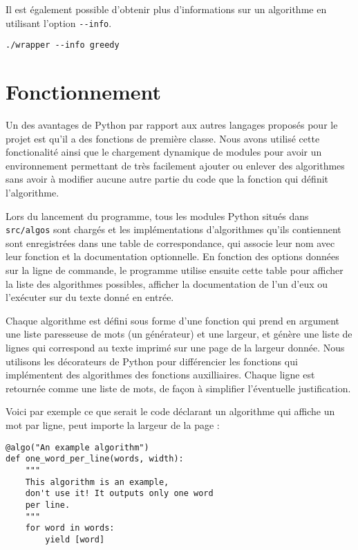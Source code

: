 \documentclass[a4paper, 11pt]{article}
\begin{document}
Il est également possible d'obtenir plus d'informations sur un algorithme en
utilisant l'option \verb|--info|.

\begin{verbatim}
./wrapper --info greedy
\end{verbatim}

\section{Fonctionnement}

Un des avantages de Python par rapport aux autres langages proposés pour le
projet est qu'il a des fonctions de première classe. Nous avons utilisé cette
fonctionalité ainsi que le chargement dynamique de modules pour avoir un
environnement permettant de très facilement ajouter ou enlever des algorithmes
sans avoir à modifier aucune autre partie du code que la fonction qui définit
l'algorithme.

Lors du lancement du programme, tous les modules Python situés dans
\verb|src/algos| sont chargés et les implémentations d'algorithmes qu'ils
contiennent sont enregistrées dans une table de correspondance, qui associe leur
nom avec leur fonction et la documentation optionnelle. En fonction
des options données sur la ligne de commande, le programme utilise ensuite cette
table pour afficher la liste des algorithmes possibles, afficher la
documentation de l'un d'eux ou l'exécuter sur du texte donné en entrée.

Chaque algorithme est défini sous forme d'une fonction qui prend en argument une
liste paresseuse de mots (un générateur) et une largeur, et génère une liste
de lignes qui correspond au texte imprimé sur une page de la largeur donnée.
Nous utilisons les décorateurs de Python pour différencier les fonctions qui
implémentent des algorithmes des fonctions auxilliaires. Chaque ligne est
retournée comme une liste de mots, de façon à simplifier l'éventuelle
justification.

Voici par exemple ce que serait le code déclarant un algorithme qui affiche un
mot par ligne, peut importe la largeur de la page :

\begin{verbatim}
@algo("An example algorithm")
def one_word_per_line(words, width):
    """
    This algorithm is an example,
    don't use it! It outputs only one word
    per line.
    """
    for word in words:
        yield [word]
\end{verbatim}
\end{document}
